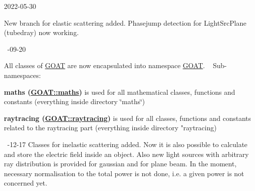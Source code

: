 2022-\/05-\/30 

New branch for elastic scattering added. Phasejump detection for Light\+Src\+Plane (tubedray) now working. 

~-\/09-\/20 

All classes of \mbox{\hyperlink{namespace_g_o_a_t}{G\+O\+AT}} are now encapsulated into namespace \mbox{\hyperlink{namespace_g_o_a_t}{G\+O\+AT}}. ~\newline
 Sub-\/namespaces\+: ~\newline
 
\begin{DoxyItemize}
\item {\bfseries{maths (\mbox{\hyperlink{namespace_g_o_a_t_1_1maths}{G\+O\+A\+T\+::maths}})}} is used for all mathematical classes, functions and constants (everything inside directory \char`\"{}maths\char`\"{})  
\item {\bfseries{raytracing (\mbox{\hyperlink{namespace_g_o_a_t_1_1raytracing}{G\+O\+A\+T\+::raytracing}})}} is used for all classes, functions and constants related to the raytracing part (everything inside directory "{}raytracing)  
\end{DoxyItemize}

~-\/12-\/17 Classes for inelastic scattering added. Now it is also possible to calculate and store the electric field inside an object. Also new light sources with arbitrary ray distribution is provided for gaussian and for plane beam. In the moment, necessary normalisation to the total power is not done, i.\+e. a given power is not concerned yet. 